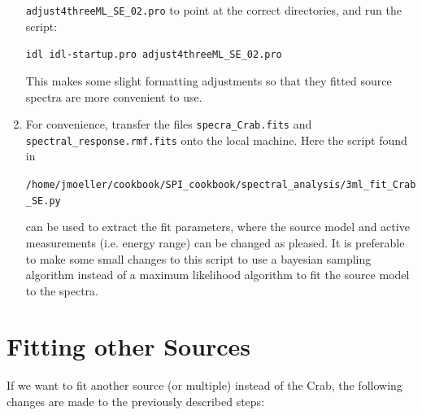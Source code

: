 \documentclass{report}
\begin{document}
\begin{enumerate}
    \verb|adjust4threeML_SE_02.pro| to point at the correct directories, and run the script:
    
    \verb|idl idl-startup.pro adjust4threeML_SE_02.pro|

    This makes some slight formatting adjustments so that they fitted source spectra are more convenient to use. 

    \item For convenience, transfer the files \verb|specra_Crab.fits| and \verb|spectral_response.rmf.fits| onto the local machine. Here the script found in
    
    \verb|/home/jmoeller/cookbook/SPI_cookbook/spectral_analysis/3ml_fit_Crab_SE.py|
    
    can be used to extract the fit parameters, where the source model and active measurements (i.e. energy range) can be changed as pleased. It is preferable to make some small changes to this script to use a bayesian sampling algorithm instead of a maximum likelihood algorithm to fit the source model to the spectra.
\end{enumerate}


\section{Fitting other Sources}
If we want to fit another source (or multiple) instead of the Crab, the following changes are made to the previously described steps:
\end{document}

